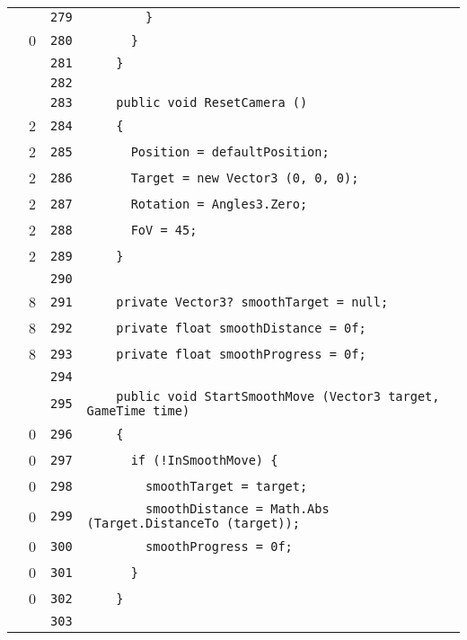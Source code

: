 \documentclass[a4paper,10pt]{article}
\begin{document}
\begin{longtable}[l]{lrrl}
\cellcolor{gray} &  & \verb~279~ & \verb~        }~\\
\cellcolor{red} & 0 & \verb~280~ & \verb~      }~\\
\cellcolor{gray} &  & \verb~281~ & \verb~    }~\\
\cellcolor{gray} &  & \verb~282~ & \verb~~\\
\cellcolor{gray} &  & \verb~283~ & \verb~    public void ResetCamera ()~\\
\cellcolor{green} & 2 & \verb~284~ & \verb~    {~\\
\cellcolor{green} & 2 & \verb~285~ & \verb~      Position = defaultPosition;~\\
\cellcolor{green} & 2 & \verb~286~ & \verb~      Target = new Vector3 (0, 0, 0);~\\
\cellcolor{green} & 2 & \verb~287~ & \verb~      Rotation = Angles3.Zero;~\\
\cellcolor{green} & 2 & \verb~288~ & \verb~      FoV = 45;~\\
\cellcolor{green} & 2 & \verb~289~ & \verb~    }~\\
\cellcolor{gray} &  & \verb~290~ & \verb~~\\
\cellcolor{green} & 8 & \verb~291~ & \verb~    private Vector3? smoothTarget = null;~\\
\cellcolor{green} & 8 & \verb~292~ & \verb~    private float smoothDistance = 0f;~\\
\cellcolor{green} & 8 & \verb~293~ & \verb~    private float smoothProgress = 0f;~\\
\cellcolor{gray} &  & \verb~294~ & \verb~~\\
\cellcolor{gray} &  & \verb~295~ & \verb~    public void StartSmoothMove (Vector3 target, GameTime time)~\\
\cellcolor{red} & 0 & \verb~296~ & \verb~    {~\\
\cellcolor{red} & 0 & \verb~297~ & \verb~      if (!InSmoothMove) {~\\
\cellcolor{red} & 0 & \verb~298~ & \verb~        smoothTarget = target;~\\
\cellcolor{red} & 0 & \verb~299~ & \verb~        smoothDistance = Math.Abs (Target.DistanceTo (target));~\\
\cellcolor{red} & 0 & \verb~300~ & \verb~        smoothProgress = 0f;~\\
\cellcolor{red} & 0 & \verb~301~ & \verb~      }~\\
\cellcolor{red} & 0 & \verb~302~ & \verb~    }~\\
\cellcolor{gray} &  & \verb~303~ & \verb~~\\

\end{longtable}
\end{document}
